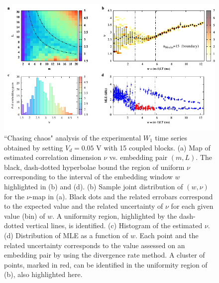 \begin{figure}[H]
    \centering
    \includegraphics[width=\linewidth]{../blocks/15_blocks/edge/2e5_points/plots/chaos_low.pdf}
    \caption{``Chasing chaos" analysis of the experimental $W_1$ time series obtained by setting $V_d=0.05$ V with 15 coupled blocks.
    (a) Map of estimated correlation dimension $\nu$ vs. embedding pair $(m, L)$.
    The black, dash-dotted hyperbolae bound the region of uniform $\nu$ corresponding to the interval of the
    embedding window $w$ highlighted in (b) and (d).
    (b) Sample joint distribution of $(w,\nu)$ for the $\nu$-map in (a).
    Black dots and the related errobars correspond to the expected value and the related uncertainty of $\nu$
    for each given value (bin) of $w$. A uniformity region, highlighted by the dash-dotted vertical lines,
    is identified. (c) Histogram of the estimated $\nu$. (d) Distribution of MLE as a function of $w$. Each point and the related
    uncertainty corresponds to the value assessed on an embedding pair by using the divergence rate method.
    A cluster of points, marked in red, can be identified in the uniformity region of (b), also highlighted here.}
    \label{fig:15 blocks chaos}
\end{figure}

